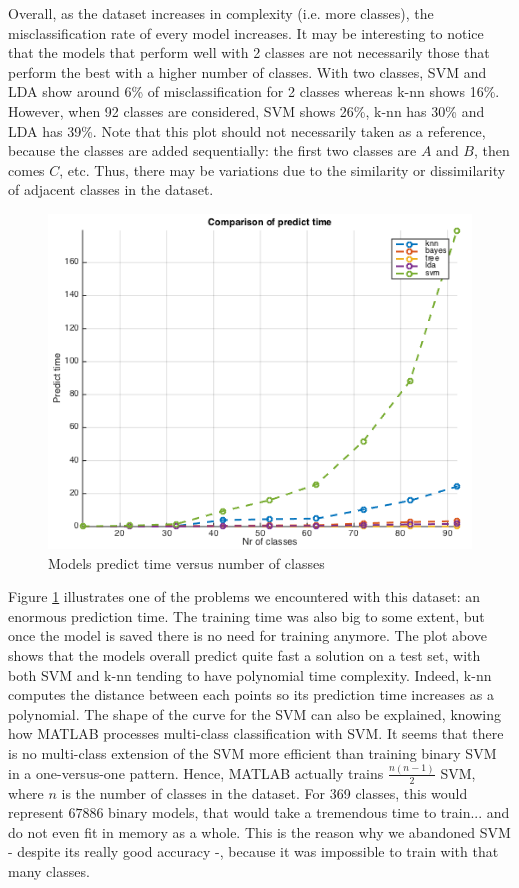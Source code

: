 \documentclass[twocolumn]{article}%
\begin{document}
	Overall, as the dataset increases in complexity (i.e. more classes), the misclassification rate of every model increases. It may be interesting to notice that the models that perform well with 2 classes are not necessarily those that perform the best with a higher number of classes. With two classes, SVM and LDA show around 6\% of misclassification for 2 classes whereas k-nn shows 16\%. However, when 92 classes are considered, SVM shows 26\%, k-nn has 30\% and LDA has 39\%. Note that this plot should not necessarily taken as a reference, because the classes are added sequentially: the first two classes are $A$ and $B$, then comes $C$, etc. Thus, there may be variations due to the similarity or dissimilarity of adjacent classes in the dataset. 
	
	
	\begin{figure}[h!]
	\centering
	\includegraphics[scale=0.45]{images/time_vs_nclasses.png}
	\caption{Models predict time versus number of classes}
	\label{timeVSnClasses}
	\end{figure}
	
	Figure \ref{timeVSnClasses} illustrates one of the problems we encountered with this dataset: an enormous prediction time. The training time was also big to some extent, but once the model is saved there is no need for training anymore. The plot above shows that the models overall predict quite fast a solution on a test set, with both SVM and k-nn tending to have polynomial time complexity. Indeed, k-nn computes the distance between each points so its prediction time increases as a polynomial. The shape of the curve for the SVM can also be explained, knowing how MATLAB processes multi-class classification with SVM. It seems that there is no multi-class extension of the SVM more efficient than training binary SVM in a one-versus-one pattern. Hence, MATLAB actually trains $\frac{n(n-1)}{2}$ SVM, where $n$ is the number of classes in the dataset. For 369 classes, this would represent $67886$ binary models, that would take a tremendous time to train... and do not even fit in memory as a whole. This is the reason why we abandoned SVM - despite its really good accuracy -, because it was impossible to train with that many classes.
	
\end{document}

